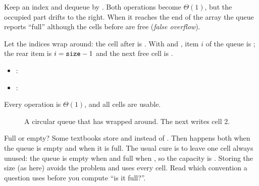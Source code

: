  Keep an index  and dequeue by . Both
operations become $\Theta(1)$, but the occupied part  drifts to
the right. When it reaches the end of the array the queue reports ``full'' although the
cells before  are free (\emph{false overflow}).

 Let the indices wrap around: the cell after  is
. With  and , item $i$ of the queue is
; the rear item is $i=\texttt{size}-1$ and the next free cell is
.
\begin{itemize}
\item {}: 
\item {}: 
\end{itemize}
Every operation is $\Theta(1)$, and all  cells are usable.


\begin{figure}[ht]\centering
{}
\caption{A circular queue that has wrapped around. The next  writes cell 2.}
\end{figure}

\begin{note}{Full or empty?}
Some textbooks store  and  instead of . Then
 happens both when the queue is empty and when it is full. The usual
cure is to leave one cell always unused: the queue is empty when  and
full when , so the capacity is . Storing the size
(as here) avoids the problem and uses every cell. Read which convention a question uses
before you compute ``is it full?''.
\end{note}


